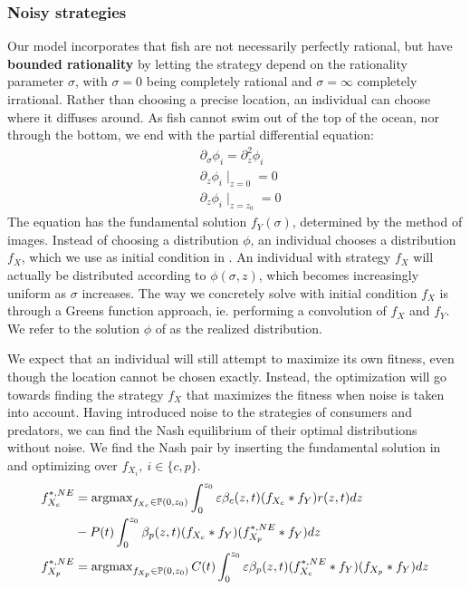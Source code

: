 \subsubsection*{Noisy strategies} %
Our model incorporates that fish are not necessarily perfectly rational, but have \textbf{bounded rationality} by letting the strategy depend on the rationality parameter $\sigma$, with $\sigma=0$ being completely rational and $\sigma = \infty$ completely irrational. Rather than choosing a precise location, an individual can choose where it diffuses around. As fish cannot swim out of the top of the ocean, nor through the bottom, we end with the partial differential equation:
\begin{align}
  \label{eq:density_PDE}
	&\partial_\sigma \phi_i = \partial_z^2 \phi_i \\
	&\partial_z \phi_i \mid_{z=0} = 0 \\
  &\partial_z \phi_i \mid_{z = z_0} = 0
\end{align}
The equation  has the fundamental solution $f_Y(\sigma)$, determined by the method of images. Instead of choosing a distribution $\phi$, an individual chooses a distribution $f_X$, which we use as initial condition in . An individual with strategy $f_X$ will actually be distributed according to $\phi(\sigma,z)$, which becomes increasingly uniform as $\sigma$ increases. The way we concretely solve  with initial condition $f_X$ is through a Greens function approach, ie. performing a convolution of $f_X$ and $f_Y$. We refer to the solution $\phi$ of  as the realized distribution.

We expect that an individual will still attempt to maximize its own fitness, even though the location cannot be chosen exactly. Instead, the optimization will go towards finding the strategy $f_X$ that maximizes the fitness when noise is taken into account.
Having introduced noise to the strategies of consumers and predators, we can find the Nash equilibrium of their optimal distributions without noise. We find the Nash pair by inserting the fundamental solution in  and optimizing over $f_{X_i},~i\in \{c, p\}$.
\begin{align*}
	f_{X_c}^{*,NE} &=  \operatorname{argmax}_{f_{X_c} \in \mathbb{P}(0,z_0)}  \int_0^{z_0} \varepsilon \beta_c(z,t)(f_{X_c} * f_Y) r(z,t) dz \\ & -  P(t)\int_0^{z_0} \beta_p(z,t) (f_{X_c} * f_Y)(f_{X_p}^{*,NE} * f_Y) dz \\
	f_{X_p}^{*,NE} &=  \operatorname{argmax}_{f_{X_p} \in \mathbb{P}(0,z_0)}C(t) \int_0^{z_0} \varepsilon \beta_p(z,t)(f_{X_c}^{*,NE}  * f_Y)(f_{X_p}* f_Y) dz
\end{align*}

